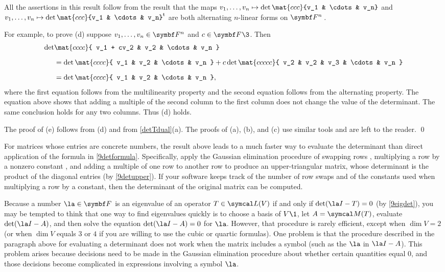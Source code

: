 \proof
All the assertions in this result follow from the result that the maps $v_1, \ldots, v_n \mapsto \det \mat{ccc}{v_1 & \cdots & v_n}$ and
$v_1, \ldots, v_n \mapsto \det \tran{\mat{ccc}{v_1 & \cdots & v_n}}$
are both alternating $n$-linear forms on $\FF n$ .

For example, to prove (d) suppose $v_1, \ldots, v_n \in \F n$ and $c \in \F{}\3$. Then
\begin{align*}
\det &\mat{cccc}{ v_1 + cv_2 & v_2 & \cdots & v_n } \\[6bp]
&=\det \mat{cccc}{ v_1 & v_2 & \cdots & v_n } + c\det \mat{ccccc}{ v_2 & v_2 & v_3 & \cdots & v_n } \\[6bp]
&= \det \mat{cccc}{ v_1 & v_2 & \cdots & v_n },
\end{align*}
where the first equation follows from the multilinearity property and the second equation follows from the alternating property.
The equation above shows that adding a multiple of the second column to the first column does not change the value of the determinant. The same conclusion holds for any two columns. Thus (d) holds.

The proof of (e) follows from (d) and from \ref{detTdual}(a). The proofs of (a), (b), and (c) use similar tools and are left to the reader.
\qed

For matrices whose entries are concrete numbers, the result above leads to a much faster way to evaluate the determinant than direct application of the formula in \ref{9detformula}. Specifically, apply the Gaussian elimination procedure of swapping rows , multiplying a row by a nonzero constant , and adding a multiple of one row to another row  to produce an upper-triangular matrix, whose determinant is the product of the diagonal entries (by \ref{9detupper}). If your software keeps track of the number of row swaps and of the constants used when multiplying a row by a constant, then the determinant of the original matrix can be computed.

Because a number $\la \in \F{}$ is an eigenvalue of an operator $T \in \L(V)$ if and only if $\det(\la I - T) = 0$ (by \ref{9eigdet}), you may be tempted to think that one way to find eigenvalues quickly is to choose a basis of $V\1$, let $A = \M(T)$, evaluate $\det(\la I - A)$, and then solve the equation $\det(\la I - A) = 0$ for $\la$. However, that procedure is rarely efficient, except when $\dim V = 2$ (or when $\dim V$ equals $3$ or $4$ if you are willing to use the cubic or quartic formulas). One problem is that the procedure described in the paragraph above for evaluating a determinant does not work when the matrix includes a symbol (such as the $\la$ in $\la I - A$). This problem arises because decisions need to be made in the Gaussian elimination procedure about whether certain quantities equal $0$, and those decisions become complicated in expressions involving a symbol $\la$.

